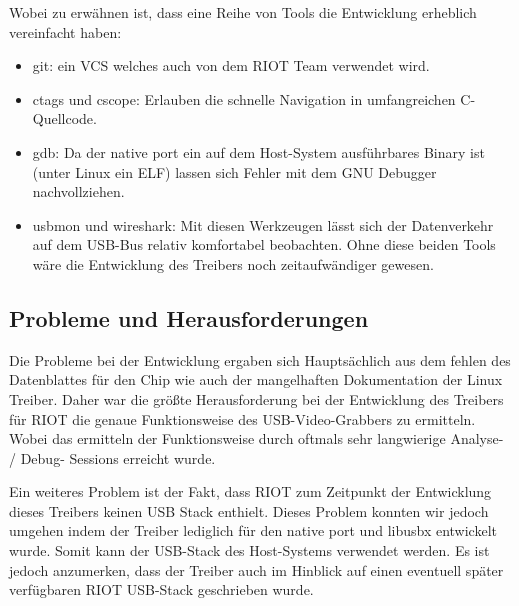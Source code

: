 Wobei zu erwähnen ist, dass eine Reihe von Tools die Entwicklung erheblich vereinfacht haben:
\begin{itemize}
 \item git: ein VCS welches auch von dem RIOT Team verwendet wird. 
 \item ctags und cscope: Erlauben die schnelle Navigation in umfangreichen C-Quellcode.
 \item gdb: Da der native port ein auf dem Host-System ausführbares Binary ist (unter Linux ein ELF) lassen sich Fehler mit dem GNU Debugger nachvollziehen.
 \item usbmon und wireshark: Mit diesen Werkzeugen lässt sich der Datenverkehr auf dem USB-Bus relativ komfortabel beobachten. Ohne diese beiden Tools wäre die Entwicklung des Treibers noch zeitaufwändiger gewesen. 
\end{itemize}

\subsection{Probleme und Herausforderungen}
Die Probleme bei der Entwicklung ergaben sich Hauptsächlich aus dem fehlen des Datenblattes für den \stk{} Chip wie auch der mangelhaften Dokumentation der Linux Treiber. Daher war die größte Herausforderung bei der Entwicklung des Treibers für RIOT die genaue Funktionsweise des USB-Video-Grabbers zu ermitteln. Wobei das ermitteln der Funktionsweise durch oftmals sehr langwierige Analyse- / Debug- Sessions erreicht wurde.

Ein weiteres Problem ist der Fakt, dass RIOT zum Zeitpunkt der Entwicklung dieses Treibers keinen USB Stack enthielt. Dieses Problem konnten wir jedoch umgehen indem der Treiber lediglich für den native port und libusbx entwickelt wurde. Somit kann der USB-Stack des Host-Systems verwendet werden. Es ist jedoch anzumerken, dass der Treiber auch im Hinblick auf einen eventuell später verfügbaren RIOT USB-Stack geschrieben wurde.  